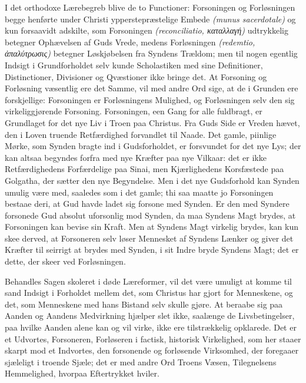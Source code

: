 \documentclass[12pt]{book}
\begin{document}
I det orthodoxe Lærebegreb blive de to Functioner: Forsoningen og
Forløsningen begge henførte under Christi
ypperstepræstelige Embede \textit{(munus sacerdotale)} og kun
forsaavidt adskilte, som Forsoningen \textit{(reconciliatio,
καταλλαγή)} udtrykkelig betegner Ophævelsen af Guds Vrede, medens
Forløsningen \textit{(redemtio, ἀπαλύτρωσις)} betegner Løskjøbelsen
fra Syndens Trældom; men til nogen egentlig Indsigt i
Grundforholdet selv kunde Scholastiken med sine Definitioner,
Distinctioner, Divisioner og Qvæstioner ikke bringe det. At Forsoning
og Forløsning væsentlig ere det Samme, vil med andre Ord sige, at de
i Grunden ere forskjellige: Forsoningen er Forløsningens Mulighed,
og Forløsningen selv den sig virkeliggjørende Forsoning.
Forsoningen, een Gang for alle fuldbragt, er Grundlaget for det nye
Liv i Troen paa Christus. Fra Guds Side er Vreden hævet, den i Loven
truende Retfærdighed forvandlet til Naade. Det gamle, piinlige
Mørke, som Synden bragte ind i Gudsforholdet, er forsvundet for det
nye Lys; der kan altsaa begyndes forfra med nye Kræfter paa nye
Vilkaar: det er ikke Retfærdighedens Forfærdelige paa Sinai, men
Kjærlighedens Korsfæstede paa Golgatha, der sætter den nye
Begyndelse. Men i det nye Gudsforhold kan Synden umulig være med,
saaledes som i det gamle; thi saa maatte jo Forsoningen bestaae
deri, at Gud havde ladet sig forsone med Synden. Er den med Syndere
forsonede Gud absolut uforsonlig mod Synden, da maa Syndens Magt
brydes, at Forsoningen kan bevise sin Kraft. Men at Syndens Magt
virkelig brydes, kan kun skee derved, at Forsoneren selv løser
Mennesket af Syndens Lænker og giver det Kræfter til seirrigt at
brydes med Synden, i sit Indre bryde Syndens Magt; det er dette, der
skeer ved Forløsningen.

Behandles Sagen skoleret i døde Læreformer, vil det være umuligt at
komme til sand Indsigt i Forholdet mellem det, som Christus har
gjort for Menneskene, og det, som Menneskene med hans Bistand selv
skulle gjøre.
At beraabe sig paa Aanden og Aandens Medvirkning hjælper slet ikke,
saalænge de Livsbetingelser, paa hvilke Aanden alene kan og vil
virke, ikke ere tilstrækkelig opklarede. Det er et Udvortes,
Forsoneren, Forløseren i factisk, historisk Virkelighed, som her
staaer skarpt mod et Indvortes, den forsonende og forløsende
Virksomhed, der foregaaer sjæleligt i troende Sjæle; det er med
andre Ord Troens Væsen, Tilegnelsens Hemmelighed, hvorpaa
Eftertrykket hviler.
\end{document}
